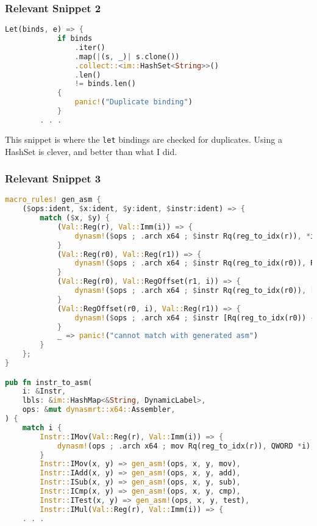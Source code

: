 	\subsubsection{Relevant Snippet 2}

	\begin{lstlisting}[language=Rust]
        Let(binds, e) => {
            if binds
                .iter()
                .map(|(s, _)| s.clone())
                .collect::<im::HashSet<String>>()
                .len()
                != binds.len()
            {
                panic!("Duplicate binding")
            }
	    . . .
	\end{lstlisting}

	This snippet is where the \verb|let| bindings are checked for duplicates. Using a HashSet is clever, and better than what I did.

	\subsubsection{Relevant Snippet 3}

	\begin{lstlisting}[language=Rust]
macro_rules! gen_asm {
    ($ops:ident, $x:ident, $y:ident, $instr:ident) => {
        match ($x, $y) {
            (Val::Reg(r), Val::Imm(i)) => {
                dynasm!($ops ; .arch x64 ; $instr Rq(reg_to_idx(r)), *i as _);
            }
            (Val::Reg(r0), Val::Reg(r1)) => {
                dynasm!($ops ; .arch x64 ; $instr Rq(reg_to_idx(r0)), Rq(reg_to_idx(r1)));
            }
            (Val::Reg(r0), Val::RegOffset(r1, i)) => {
                dynasm!($ops ; .arch x64 ; $instr Rq(reg_to_idx(r0)), [Rq(reg_to_idx(r1)) - (*i as i32) * 8]);
            }
            (Val::RegOffset(r0, i), Val::Reg(r1)) => {
                dynasm!($ops ; .arch x64 ; $instr [Rq(reg_to_idx(r0)) - (*i as i32) * 8], Rq(reg_to_idx(r1)));
            }
            _ => panic!("cannot match with generated asm")
        }
    };
}

pub fn instr_to_asm(
    i: &Instr,
    lbls: &im::HashMap<&String, DynamicLabel>,
    ops: &mut dynasmrt::x64::Assembler,
) {
    match i {
        Instr::IMov(Val::Reg(r), Val::Imm(i)) => {
            dynasm!(ops ; .arch x64 ; mov Rq(reg_to_idx(r)), QWORD *i);
        }
        Instr::IMov(x, y) => gen_asm!(ops, x, y, mov),
        Instr::IAdd(x, y) => gen_asm!(ops, x, y, add),
        Instr::ISub(x, y) => gen_asm!(ops, x, y, sub),
        Instr::ICmp(x, y) => gen_asm!(ops, x, y, cmp),
        Instr::ITest(x, y) => gen_asm!(ops, x, y, test),
        Instr::IMul(Val::Reg(r), Val::Imm(i)) => {
	. . .
	\end{lstlisting}

